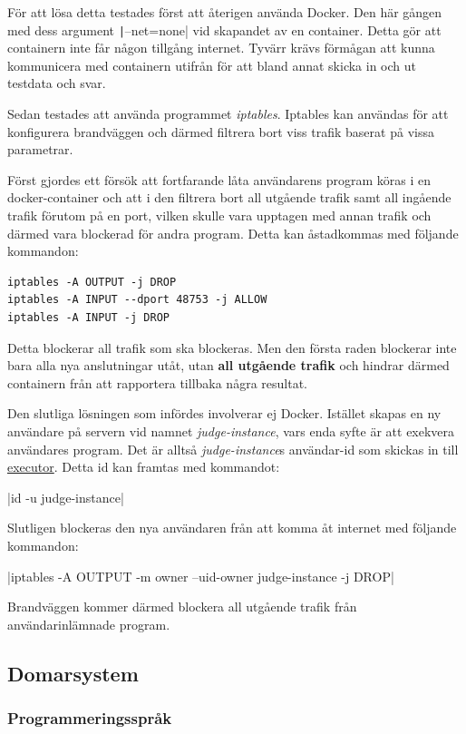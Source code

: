 \documentclass{article}
\begin{document}
För att lösa detta testades först att återigen använda Docker. Den här gången
med dess argument \texttt|--net=none| vid skapandet av en container. Detta gör
att containern inte får någon tillgång internet. Tyvärr krävs förmågan att kunna
kommunicera med containern utifrån för att bland annat skicka in och ut testdata
och svar.

Sedan testades att använda programmet \textit{iptables}. Iptables kan användas
för att konfigurera brandväggen och därmed filtrera bort viss trafik baserat på
vissa parametrar.

Först gjordes ett försök att fortfarande låta användarens program köras i en
docker-container och att i den filtrera bort all utgående trafik samt all
ingående trafik förutom på en port, vilken skulle vara upptagen med annan
trafik och därmed vara blockerad för andra program. Detta kan åstadkommas med
följande kommandon:

\begin{verbatim}
iptables -A OUTPUT -j DROP
iptables -A INPUT --dport 48753 -j ALLOW
iptables -A INPUT -j DROP
\end{verbatim}

Detta blockerar all trafik som ska blockeras. Men den första raden blockerar
inte bara alla nya anslutningar utåt, utan \textbf{all utgående trafik} och
hindrar därmed containern från att rapportera tillbaka några resultat.

Den slutliga lösningen som infördes involverar ej Docker. Istället skapas
en ny användare på servern vid namnet \textit{judge-instance}, vars enda
syfte är att exekvera användares program. Det är alltså \textit{judge-instance}s
användar-id som skickas in till \hyperlink{executor}{executor}.
Detta id kan framtas med kommandot:

|id -u judge-instance|

Slutligen blockeras den nya användaren från att komma åt internet med följande
kommandon:

|iptables -A OUTPUT -m owner --uid-owner judge-instance -j DROP|

Brandväggen kommer därmed blockera all utgående trafik från användarinlämnade
program.

\subsection{Domarsystem}

\subsubsection{Programmeringsspråk}
\end{document}
